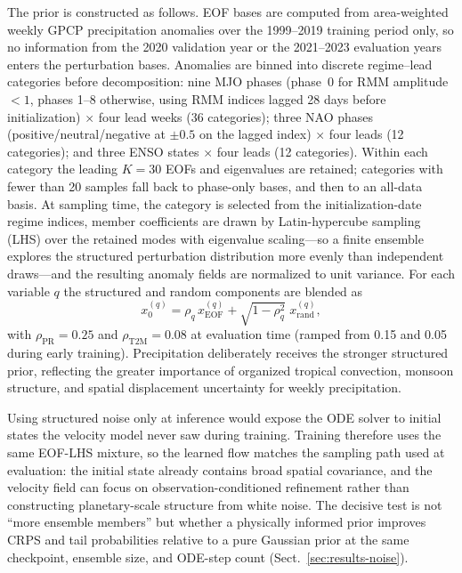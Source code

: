 \documentclass[11pt]{article}
\begin{document}
The prior is constructed as follows. EOF bases are computed from area-weighted weekly GPCP precipitation anomalies over the 1999--2019 training period only, so no information from the 2020 validation year or the 2021--2023 evaluation years enters the perturbation bases. Anomalies are binned into discrete regime--lead categories before decomposition: nine MJO phases (phase~0 for RMM amplitude $<1$, phases 1--8 otherwise, using RMM indices lagged 28 days before initialization) $\times$ four lead weeks (36 categories); three NAO phases (positive/neutral/negative at $\pm0.5$ on the lagged index) $\times$ four leads (12 categories); and three ENSO states $\times$ four leads (12 categories). Within each category the leading $K=30$ EOFs and eigenvalues are retained; categories with fewer than 20 samples fall back to phase-only bases, and then to an all-data basis. At sampling time, the category is selected from the initialization-date regime indices, member coefficients are drawn by Latin-hypercube sampling (LHS) over the retained modes with eigenvalue scaling---so a finite ensemble explores the structured perturbation distribution more evenly than independent draws---and the resulting anomaly fields are normalized to unit variance. For each variable $q$ the structured and random components are blended as
\begin{equation}
  x_0^{(q)} = \rho_q\, x_{\mathrm{EOF}}^{(q)} + \sqrt{1-\rho_q^2}\; x_{\mathrm{rand}}^{(q)},
\end{equation}
with $\rho_{\mathrm{PR}}=0.25$ and $\rho_{\mathrm{T2M}}=0.08$ at evaluation time (ramped from 0.15 and 0.05 during early training). Precipitation deliberately receives the stronger structured prior, reflecting the greater importance of organized tropical convection, monsoon structure, and spatial displacement uncertainty for weekly precipitation.

Using structured noise only at inference would expose the ODE solver to initial states the velocity model never saw during training. Training therefore uses the same EOF-LHS mixture, so the learned flow matches the sampling path used at evaluation: the initial state already contains broad spatial covariance, and the velocity field can focus on observation-conditioned refinement rather than constructing planetary-scale structure from white noise. The decisive test is not ``more ensemble members'' but whether a physically informed prior improves CRPS and tail probabilities relative to a pure Gaussian prior at the same checkpoint, ensemble size, and ODE-step count (Sect.~\ref{sec:results-noise}).
\end{document}
